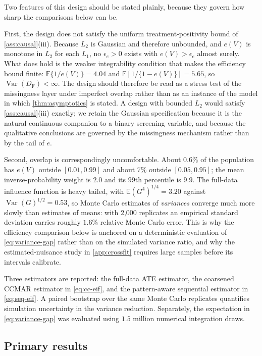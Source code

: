 \documentclass[11pt]{article}
\theoremstyle{definition}
\newcommand{\E}{\mathbb{E}}
\newcommand{\Var}{\operatorname{Var}}
\newcommand{\1}{\mathbf{1}}
\newcommand{\F}{\mathrm{F}}
\begin{document}
Two features of this design should be stated plainly, because they govern how
sharp the comparisons below can be.

First, the design does not satisfy the uniform treatment-positivity bound of
\cref{ass:causal}(iii). Because $L_2$ is Gaussian and therefore unbounded, and
$e(V)$ is monotone in $L_2$ for each $L_1$, no $\epsilon_e>0$ exists with
$e(V)>\epsilon_e$ almost surely. What does hold is the weaker integrability
condition that makes the efficiency bound finite: $\E\{1/e(V)\}=4.04$ and
$\E[1/\{1-e(V)\}]=5.65$, so $\Var(D_{\F})<\infty$. The design should therefore
be read as a stress test of the missingness layer under imperfect overlap rather
than as an instance of the model in which \cref{thm:asymptotics} is stated. A
design with bounded $L_2$ would satisfy \cref{ass:causal}(iii) exactly; we retain
the Gaussian specification because it is the natural continuous companion to a
binary screening variable, and because the qualitative conclusions are governed
by the missingness mechanism rather than by the tail of $e$.

Second, overlap is correspondingly uncomfortable. About $0.6\%$ of the population
has $e(V)$ outside $[0.01,0.99]$ and about $7\%$ outside $[0.05,0.95]$; the mean
inverse-probability weight is $2.0$ and its $99$th percentile is $9.9$. The
full-data influence function is heavy tailed, with
$\E(G^4)^{1/4}=3.20$ against $\Var(G)^{1/2}=0.53$, so Monte Carlo estimates of
\emph{variances} converge much more slowly than estimates of means: with 2,000
replicates an empirical standard deviation carries roughly $1.6\%$ relative Monte
Carlo error. This is why the efficiency comparison below is anchored on a
deterministic evaluation of \cref{eq:variance-gap} rather than on the simulated
variance ratio, and why the estimated-nuisance study in \cref{app:crossfit}
requires large samples before its intervals calibrate.

Three estimators are reported: the full-data ATE estimator, the coarsened CCMAR estimator in \cref{eq:cc-eif}, and the pattern-aware sequential estimator in \cref{eq:seq-eif}. A paired bootstrap over the same Monte Carlo replicates quantifies simulation uncertainty in the variance reduction. Separately, the expectation in \cref{eq:variance-gap} was evaluated using $1.5$ million numerical integration draws.

\subsection{Primary results}
\end{document}
